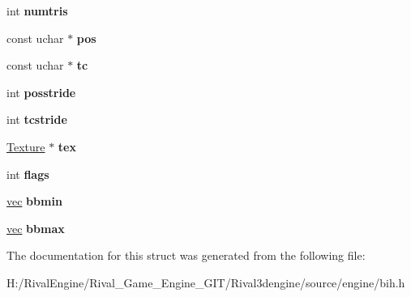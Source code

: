 \begin{DoxyCompactItemize}
\item 
\mbox{\label{struct_b_i_h_1_1mesh_ab63087766adfc60ebc4d8f2aca019a64}} 
int {\bfseries numtris}
\item 
\mbox{\label{struct_b_i_h_1_1mesh_ae6c7d36724f4ec28c350f6cf2fc6e4d9}} 
const uchar $\ast$ {\bfseries pos}
\item 
\mbox{\label{struct_b_i_h_1_1mesh_aabd3d326aac2f09b7a5dabf95bf76e2a}} 
const uchar $\ast$ {\bfseries tc}
\item 
\mbox{\label{struct_b_i_h_1_1mesh_a5d63db2bb0ab3d513a228f5cc1838a2c}} 
int {\bfseries posstride}
\item 
\mbox{\label{struct_b_i_h_1_1mesh_a499502f3bd4fae50fcb737796170ca7d}} 
int {\bfseries tcstride}
\item 
\mbox{\label{struct_b_i_h_1_1mesh_aebbada5dd2aaf8f2296947b7731ac82e}} 
\hyperlink{struct_texture}{Texture} $\ast$ {\bfseries tex}
\item 
\mbox{\label{struct_b_i_h_1_1mesh_a9d6428ad2881de0300e7f703c740df1a}} 
int {\bfseries flags}
\item 
\mbox{\label{struct_b_i_h_1_1mesh_af0feccb42e180fd706c4df08d754ab21}} 
\hyperlink{structvec}{vec} {\bfseries bbmin}
\item 
\mbox{\label{struct_b_i_h_1_1mesh_a8142d3bb2d968af21df4de81bfa17ff1}} 
\hyperlink{structvec}{vec} {\bfseries bbmax}
\end{DoxyCompactItemize}


The documentation for this struct was generated from the following file\+:\begin{DoxyCompactItemize}
\item 
H\+:/\+Rival\+Engine/\+Rival\+\_\+\+Game\+\_\+\+Engine\+\_\+\+G\+I\+T/\+Rival3dengine/source/engine/bih.\+h\end{DoxyCompactItemize}
